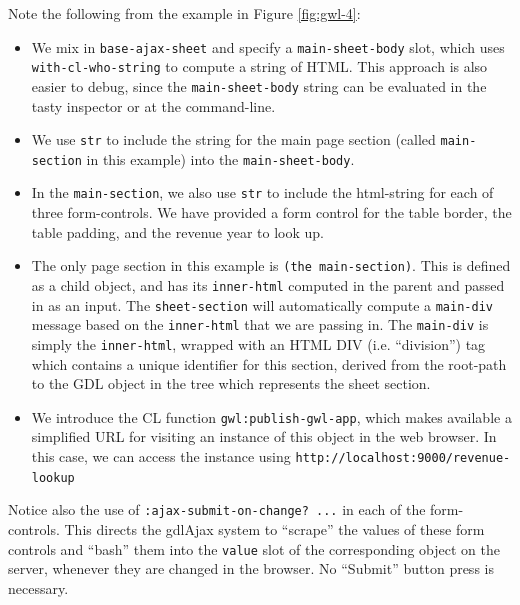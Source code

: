 \documentclass [11pt]{book}
\begin{document}
Note the following from the example in Figure 
\ref{fig:gwl-4}:

\begin{itemize}

\item We mix in \texttt{base-ajax-sheet} and specify a \texttt{main-sheet-body} slot, which uses \texttt{with-cl-who-string} to compute a string
                   of HTML. This approach is also easier to debug,
                   since the \texttt{main-sheet-body} string
                   can be evaluated in the tasty inspector or at the
                   command-line.

\item We use \texttt{str} to include the string for the main page
        section (called \texttt{main-section} in this example) into the \texttt{main-sheet-body}.

\item In the \texttt{main-section}, we also
        use \texttt{str} to include the html-string for each of
        three form-controls. We have provided a form control for the
        table border, the table padding, and the revenue year to look
        up.

\item The only page section in this example is \texttt{(the main-section)}. This is defined as a child object, and has its \texttt{inner-html} computed in the parent and passed in as an input. The \texttt{sheet-section} will automatically compute a \texttt{main-div} message based on the \texttt{inner-html} that we are passing in. The \texttt{main-div} is simply the \texttt{inner-html}, wrapped with
               an HTML DIV (i.e. ``division'') tag which contains a unique
               identifier for this section, derived from the root-path
               to the GDL object in the tree which represents the
               sheet section.

\item We introduce the CL function \texttt{gwl:publish-gwl-app}, which makes available a simplified URL for visiting an instance of this
        object in the web browser. In this case, we can access the
        instance using \texttt{http://localhost:9000/revenue-lookup}

\end{itemize}





Notice also the use of \texttt{:ajax-submit-on-change? ...} in each of the form-controls. This directs the gdlAjax
	  system to ``scrape'' the values of these form controls
	  and ``bash'' them into the \texttt{value} slot of the corresponding object on the server, whenever
they are changed in the browser. No ``Submit'' button press is
necessary.
\end{document}
